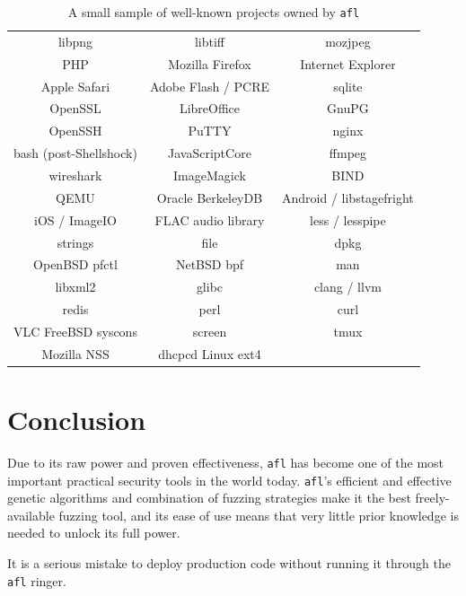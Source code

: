 \begin{table}[H]
\centering
\begin{tabular}{c | c | c}
libpng & libtiff & mozjpeg \\
PHP & Mozilla Firefox & Internet Explorer \\
Apple Safari & Adobe Flash / PCRE & sqlite \\
OpenSSL & LibreOffice & GnuPG \\
OpenSSH & PuTTY & nginx \\
bash (post-Shellshock) & JavaScriptCore & ffmpeg \\
wireshark & ImageMagick & BIND \\
QEMU & Oracle BerkeleyDB & Android / libstagefright \\
iOS / ImageIO & FLAC audio library & less / lesspipe \\
strings & file & dpkg \\
OpenBSD pfctl & NetBSD bpf & man \\
libxml2 & glibc & clang / llvm \\
redis & perl & curl \\
VLC FreeBSD syscons & screen & tmux  \\
Mozilla NSS & dhcpcd Linux ext4 \\
\end{tabular}
\caption{A small sample of well-known projects owned by \texttt{afl}}
\label{fig:afl-trophies}
\end{table}

\section{Conclusion}

Due to its raw power and proven effectiveness, \texttt{afl} has become one of
the most important practical security tools in the world today. \texttt{afl}'s
efficient and effective genetic algorithms and combination of fuzzing
strategies make it the best freely-available fuzzing tool, and its ease
of use means that very little prior knowledge is needed to unlock its full
power.

It is a serious mistake to deploy production code without running it through
the \texttt{afl} ringer.
